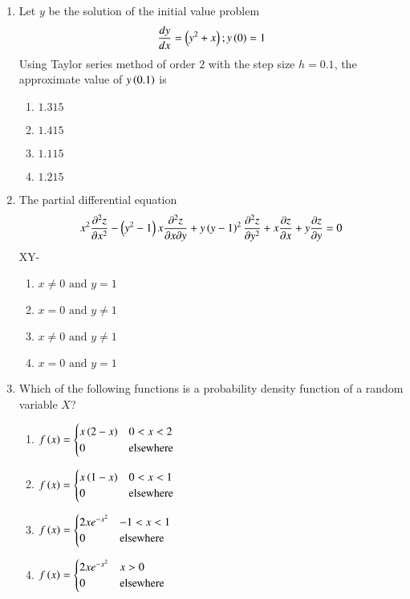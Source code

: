 \documentclass[journal,12pt,onecolumn]{IEEEtran}
\theoremstyle{remark}
\begin{document}
\begin{enumerate}
\item Let $y$ be the solution of the initial value problem
\begin{align*}
\frac{dy}{dx} = \left(y^{2} + x\right); y\left(0\right)=1
\end{align*}
Using Taylor series method of order $2$ with the step size $h=0.1$, the approximate value of $y\left(0.1\right)$ is
\hfill{}
\begin{enumerate}
\item $1.315$
\item $1.415$
\item $1.115$
\item $1.215$
\end{enumerate}

\item The partial differential equation
\begin{align*}
x^{2} \frac{\partial^{2}{z}}{\partial{x^2}} - \left(y^2 - 1\right)x\frac{\partial^{2}{z}}{\partial{x}\partial{y}} + y\left(y-1\right)^{2}\frac{\partial^{2}{z}}{\partial{y^2}} + x\frac{\partial{z}}{\partial{x}} + y\frac{\partial{z}}{\partial{y}}=0 
\end{align*}
 XY- 
\hfill{}
\begin{enumerate}
\item $x\neq0 \text{ and } y=1$
\item $x=0 \text{ and } y\neq1$
\item $x\neq0 \text{ and } y\neq1$
\item $x=0 \text{ and } y=1$
\end{enumerate}

\item Which of the following functions is a probability density function of a random variable $X$?
\hfill{}
\begin{enumerate}
\item $f\left(x\right) =
\begin{cases}
x\left(2-x\right) & 0<x<2 \\ 0 & \text{elsewhere}
\end{cases}$
\item $f\left(x\right) =
\begin{cases}
x\left(1-x\right) & 0<x<1 \\ 0 & \text{elsewhere}
\end{cases}$
\item $f\left(x\right) =
\begin{cases}
2xe^{-x^2} & -1<x<1 \\ 0 & \text{elsewhere}
\end{cases}$
\item $f\left(x\right) =
\begin{cases}
2xe^{-x^2} & x>0 \\ 0 & \text{elsewhere}
\end{cases}$
\end{enumerate}


\end{enumerate}
\end{document}
